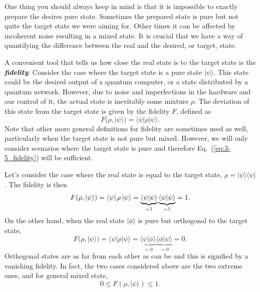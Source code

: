 One thing you should always keep in mind is that it is impossible to exactly prepare the desires pure state.
Sometimes the prepared state is pure but not quite the target state we were aiming for.
Other times it can be affected by incoherent noise resulting in a mixed state.
It is crucial that we have a way of quantifying the difference between the real and the desired, or target, state.

A convenient tool that tells us how close the real state is to the target state is the \textbf{\emph{fidelity}}.
Consider the case where the target state is a pure state $|\psi\rangle$.
This state could be the desired output of a quantum computer, or a state distributed by a quantum network.
However, due to noise and imperfections in the hardware and our control of it, the actual state is inevitably some mixture $\rho$.
The deviation of this state from the target state is given by the fidelity $F$, defined as
\begin{equation}
    F(\rho,|\psi\rangle) = \langle\psi|\rho|\psi\rangle.
    \label{eq:3-5_fidelity}
\end{equation}
Note that other more general definitions for fidelity are sometimes used as well, particularly when the target state is not pure but mixed.
However, we will only consider scenarios where the target state is pure and therefore Eq.~(\ref{eq:3-5_fidelity}) will be sufficient.

Let's consider the case where the real state is equal to the target state, $\rho=|\psi\rangle\langle\psi|$.
The fidelity is then
\begin{equation}
    F(\rho,|\psi\rangle) = \left\langle \psi \right|\rho\left| \psi \right\rangle = \underbrace{\langle\psi|\psi\rangle}_{=1} \underbrace{\langle\psi|\psi\rangle}_{=1} = 1.
\end{equation}
On the other hand, when the real state $|\phi\rangle$ is pure but orthogonal to the target state,
\begin{equation}
    F(\rho,|\psi\rangle) = \langle\psi|\rho|\psi\rangle = \underbrace{\langle\psi|\phi\rangle}_{=0} \underbrace{\langle\phi|\psi\rangle}_{=0} = 0.
\end{equation}
Orthogonal states are as far from each other as can be and this is signified by a vanishing fidelity.
In fact, the two cases considered above are the two extreme ones, and for general mixed state,
\begin{equation}
    0 \leq F(\rho,|\psi\rangle) \leq 1.
\end{equation}

